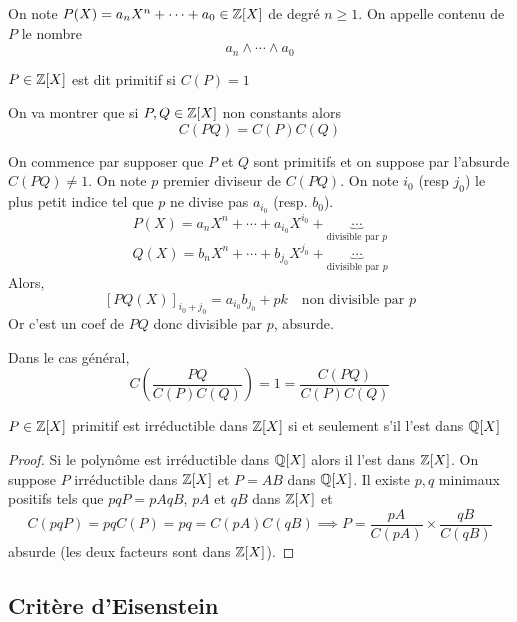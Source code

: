 On note $P(X)=a_nX^n+\cdots + a_0\in\mathbb Z[X]$ de degré $n\geq 1$. On appelle contenu de $P$ le nombre \[
    a_n\land\cdots\land a_0
\]

\begin{dfn}
    $P\in\mathbb Z[X]$ est dit primitif si $C(P)=1$
\end{dfn}

On va montrer que si $P, Q\in\mathbb Z[X]$ non constants alors \[
    C(PQ)=C(P)C(Q)
\]

On commence par supposer que $P$ et $Q$ sont primitifs et on suppose par l'absurde $C(PQ)\neq 1$. On note $p$ premier diviseur de $C(PQ)$. On note $i_0$ (resp $j_0$) le plus petit indice tel que $p$ ne divise pas $a_{i_0}$ (resp. $b_0$). \[
    P(X)=a_nX^n+\cdots +a_{i_0}X^{i_0}+\underbrace{\cdots}_{\text{divisible par } p} \]\[
    Q(X)=b_nX^n+\cdots +b_{j_0}X^{j_0}+\underbrace{\cdots}_{\text{divisible par } p}
\]
Alors, \[
    [PQ(X)]_{i_0+j_0}=a_{i_0}b_{j_0}+pk \quad \text{non divisible par $p$}
\]
Or c'est un coef de $PQ$ donc divisible par $p$, absurde.

Dans le cas général, \[
    C\left(\frac{PQ}{C(P)C(Q)}\right)=1=\frac{C(PQ)}{C(P)C(Q)}
\]

\begin{res}
    $P\in\mathbb Z[X]$ primitif est irréductible dans $\mathbb Z[X]$ si et seulement s'il l'est dans $\mathbb Q[X]$
\end{res}
\begin{proof}
Si le polynôme est irréductible dans $\mathbb Q[X]$ alors il l'est dans $\mathbb Z[X]$. On suppose $P$ irréductible dans $\mathbb Z[X]$ et $P=AB$ dans $\mathbb Q[X]$. Il existe $p, q$ minimaux positifs tels que $pqP=pAqB$, $pA$ et $qB$ dans $\mathbb Z[X]$ et \[
    C(pqP)=pqC(P)=pq=C(pA)C(qB) \implies P=\frac{pA}{C(pA)}\times \frac{qB}{C(qB)}
\]
absurde (les deux facteurs sont dans $\mathbb Z[X]$).
\end{proof}

\subsection{Critère d'Eisenstein}


